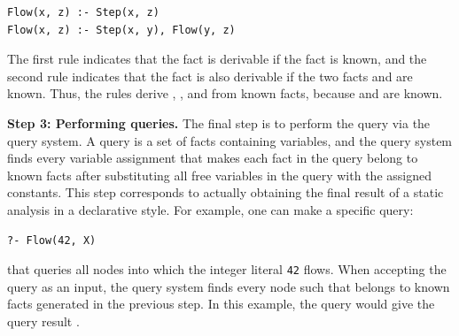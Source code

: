 \begin{lstlisting}[style=mrule]
Flow(x, z) :- Step(x, z)
Flow(x, z) :- Step(x, y), Flow(y, z)
\end{lstlisting}

\noindent
The first rule indicates that the fact  is derivable if the
fact  is known, and the second rule indicates that the fact
 is also derivable if the two facts  and
 are known.  Thus, the rules derive ,
, and  from known facts, because
 and  are known.

\smallskip
\textbf{Step 3: Performing queries.}
The final step is to perform the query via the query system.  A query is a set
of facts containing variables, and the query system finds every variable
assignment that makes each fact in the query belong to known facts
after substituting all free variables in the query with the assigned constants.  This step
corresponds to actually obtaining the final result of a static analysis in a
declarative style.  For example, one can make a specific query:

\begin{lstlisting}[style=mrule]
?- Flow(42, X)
\end{lstlisting}

\noindent
that queries all nodes into which the integer literal {\tt 42} flows.  When
accepting the query as an input, the query system finds every node 
such that  belongs to known facts generated in the previous
step.  In this example, the query would give the query result .

